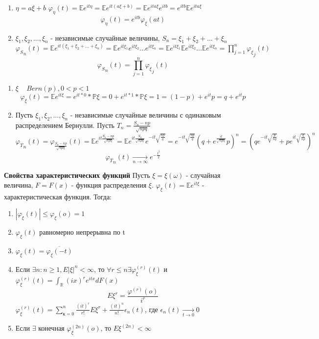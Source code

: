 \documentclass{article}
\begin{document}
\begin{enumerate}
\item $\eta = a\xi + b$ \newline
$\varphi_{\eta}(t) = \mathbb {E} e^{it\eta} = \mathbb {E} e^{it(a\xi + b)} =  \mathbb {E} e^{ita\xi} e^{itb} = e^{itb}\mathbb {E}e^{ita\xi}$
$$\varphi_{\eta}(t) = e^{itb}\varphi_{\xi}(at)$$
\item $\xi_1, \xi_2, ..., \xi_n$ - независимые случайные величины, 
$S_n = \xi_1+ \xi_2+ ... + \xi_n$ \newline
${\varphi_S}_n(t) = \mathbb{E}e^{it(\xi_1+ \xi_2+ ... + \xi_n)} = \mathbb{E}e^{it\xi_1}e^{it\xi_2}...e^{it\xi_n} =  \mathbb{E}e^{it\xi_1}\mathbb{E}e^{it\xi_2}...\mathbb{E}e^{it\xi_n} = \prod\limits_{j =1}^n{\varphi_{\xi}}_j(t)$
$${\varphi_S}_n(t) = \prod\limits_{j =1}^n{\varphi_{\xi}}_j(t)$$
\end{enumerate}
\Ex
\begin{enumerate}
\item $\xi$ ~ $Bern(p), 0<p<1$
$$\varphi_{\xi}(t) = \mathbb{E}e^{it\xi} = e^{it*0}*\mathbb {P}{\xi = 0} + e^{it*1}*\mathbb {P}{\xi=1} = (1-p)+ e^{it}p = q + e^{it}p$$
\item Пусть $\xi_1, \xi_2, ..., \xi_n$ - независимые случайные величины с одинаковым распределением Бернулли. Пусть $T_n = \frac{S_n - np}{ \sqrt{npq}}$
$${\varphi_T}_n(t) = \varphi_{\frac{S_n - np}{\sqrt{npq}}}(t) = \mathbb {E}e^{it\frac{S_n - np}{ \sqrt{npq}}} =\mathbb {E}e^{it \frac{S_n}{\sqrt{npq}}}e^{-it\sqrt{\frac{np}{q}}} = e^{-it\sqrt{\frac{np}{q}}} (q+e^{\frac{it}{\sqrt{npq}}}p)^n = (qe^{-it\sqrt{\frac{p}{nq}}} + pe^{it\sqrt{\frac{q}{np}}})^n$$
$${\varphi_T}_n(t)\underset{n \to \infty}{\longrightarrow} e^{-\frac{t^2}{2}}$$
\end{enumerate}

\textbf{Свойства характеристических функций}
\Th
Пусть $\xi = \xi(\omega)$ - случайная величина, $F = F(x)$ - функция распределения $\xi$.
$\varphi_{\xi}(t) = \mathbb{E}e^{it\xi}$  - характеристическая функция. Тогда:
\begin{enumerate}
\item $|\varphi_{\xi}(t)| \leqslant \varphi_{\xi}(o) = 1$
\item $\varphi_{\xi}(t)$ равномерно непрерывна по t
\item $\varphi_{\xi}(t) = \overline{\varphi_{\xi}(-t)} $
\item Если $\exists n: n \geqslant 1, E|\xi|^n < \infty$, то $\forall r \leqslant n \exists \varphi^{(r)}_{\xi}(t)$ и $\varphi^{(r)}_{\xi}(t) = \int_{\mathbb {R}} (ix)^re^{itx}d{F(x)}$
$$ E\xi^r = \frac{\varphi^{(r)}(o)}{i^r}$$
$\varphi^{(r)}_{\xi}(t) = \sum\limits_{к=0}^n \frac{(it)^r}{r!}E\xi^r + \frac{(it)^n}{n!}\epsilon_n(t)$, где $\epsilon_n(t) \underset{t \to 0}{\longrightarrow} 0$
\item Если $\exists$ конечная $\varphi_{\xi}^(2n)(o)$, то $E\xi^{(2n)}< \infty$  
\end{enumerate}
\end{document}

